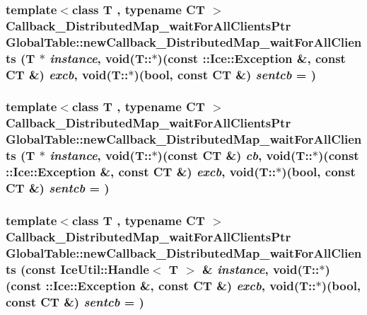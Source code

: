 \label{namespace_global_table_a1e634d2b1b68b363dabd3db9cc89bf42}
\hypertarget{namespace_global_table_ab578b4a97a1d0a8d8507fd51c34cfab9}{
\subsubsection[{newCallback\_\-DistributedMap\_\-waitForAllClients}]{\setlength{\rightskip}{0pt plus 5cm}template$<$class T , typename CT $>$ {\bf Callback\_\-DistributedMap\_\-waitForAllClientsPtr} GlobalTable::newCallback\_\-DistributedMap\_\-waitForAllClients (T $\ast$ {\em instance}, \/  void(T::$\ast$)(const ::Ice::Exception \&, const CT \&) {\em excb}, \/  void(T::$\ast$)(bool, const CT \&) {\em sentcb} = {})}}
\label{namespace_global_table_ab578b4a97a1d0a8d8507fd51c34cfab9}
\hypertarget{namespace_global_table_a966c50ca20de1840682fcd9dd03c17a3}{
\subsubsection[{newCallback\_\-DistributedMap\_\-waitForAllClients}]{\setlength{\rightskip}{0pt plus 5cm}template$<$class T , typename CT $>$ {\bf Callback\_\-DistributedMap\_\-waitForAllClientsPtr} GlobalTable::newCallback\_\-DistributedMap\_\-waitForAllClients (T $\ast$ {\em instance}, \/  void(T::$\ast$)(const CT \&) {\em cb}, \/  void(T::$\ast$)(const ::Ice::Exception \&, const CT \&) {\em excb}, \/  void(T::$\ast$)(bool, const CT \&) {\em sentcb} = {})}}
\label{namespace_global_table_a966c50ca20de1840682fcd9dd03c17a3}
\hypertarget{namespace_global_table_a200f0daaa6e176e4ee999d685777e3b7}{
\subsubsection[{newCallback\_\-DistributedMap\_\-waitForAllClients}]{\setlength{\rightskip}{0pt plus 5cm}template$<$class T , typename CT $>$ {\bf Callback\_\-DistributedMap\_\-waitForAllClientsPtr} GlobalTable::newCallback\_\-DistributedMap\_\-waitForAllClients (const IceUtil::Handle$<$ T $>$ \& {\em instance}, \/  void(T::$\ast$)(const ::Ice::Exception \&, const CT \&) {\em excb}, \/  void(T::$\ast$)(bool, const CT \&) {\em sentcb} = {})}}
